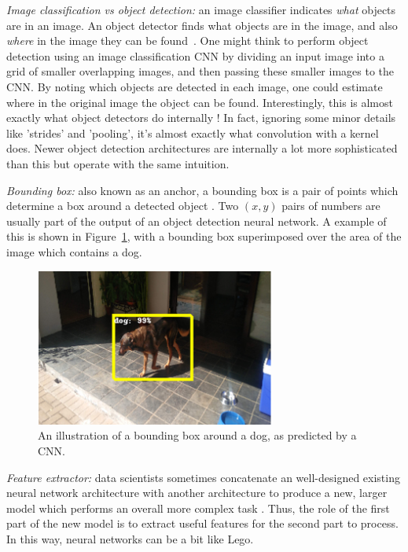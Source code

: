 \textit{Image classification vs object detection:} an image classifier indicates \emph{what} objects are in an image. An object detector finds what objects are in the image, and also \emph{where} in the image they can be found~\cite{website:object_detection_tutorial}. One might think to perform object detection using an image classification CNN by dividing an input image into a grid of smaller overlapping images, and then passing these smaller images to the CNN. By noting which objects are detected in each image, one could estimate where in the original image the object can be found. Interestingly, this is almost exactly what object detectors do internally \cite{website:object_detection_tutorial}! In fact, ignoring some minor details like 'strides' and 'pooling', it's almost exactly what convolution with a kernel does. Newer object detection architectures are internally a lot more sophisticated than this but operate with the same intuition.

\textit{Bounding box:} also known as an anchor, a bounding box is a pair of points which determine a box around a detected object \cite{website:object_detection_tutorial}. Two $(x, y)$ pairs of numbers are usually part of the output of an object detection neural network. A example of this is shown in Figure~\ref{fig:box_around_blossom2}, with a bounding box superimposed over the area of the image which contains a dog.

\begin{figure}[h!]
  \centering
  \includegraphics[width=0.7\textwidth]{literature_review/box_around_blossom}
  \caption{\label{fig:box_around_blossom2}An illustration of a bounding box around a dog, as predicted by a CNN.}
\end{figure}

\textit{Feature extractor:} data scientists sometimes concatenate an well-designed existing neural network architecture with another architecture to produce a new, larger model which performs an overall more complex task \cite{intrator1990neural}. Thus, the role of the first part of the new model is to extract useful features for the second part to process. In this way, neural networks can be a bit like Lego.

